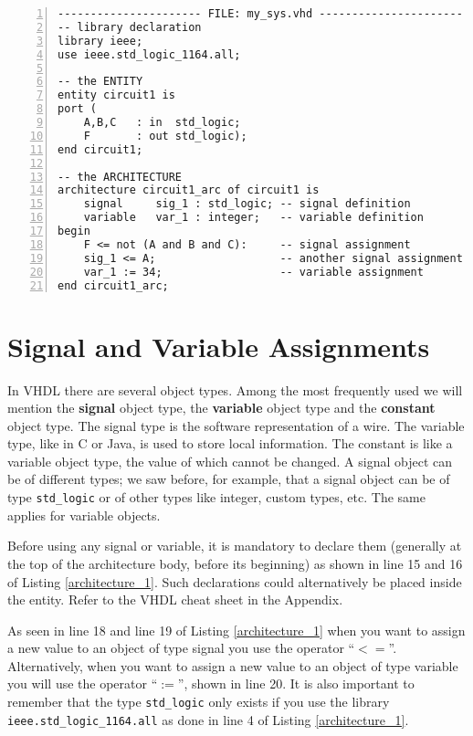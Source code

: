 \begin{lstlisting}[float, numbers=left, label=architecture_1, caption=Example of a simple VHDL block.]
---------------------- FILE: my_sys.vhd ----------------------
-- library declaration
library ieee;
use ieee.std_logic_1164.all;

-- the ENTITY
entity circuit1 is
port (
    A,B,C   : in  std_logic;
    F       : out std_logic);
end circuit1;

-- the ARCHITECTURE
architecture circuit1_arc of circuit1 is
	signal     sig_1 : std_logic; -- signal definition
	variable   var_1 : integer;   -- variable definition
begin
	F <= not (A and B and C):     -- signal assignment
	sig_1 <= A;                   -- another signal assignment
	var_1 := 34;                  -- variable assignment
end circuit1_arc;
\end{lstlisting}

\section{Signal and Variable Assignments}
In VHDL there are several object types. Among the most frequently used we will mention the \textbf{signal} object type, the \textbf{variable} object type and the \textbf{constant} object type. The signal type is the software representation of a wire. The variable type, like in C or Java, is used to store local information. The constant is like a variable object type, the value of which cannot be changed. A signal object can be of different types; we saw before, for example, that a signal object can be of type \texttt{std\_logic} or of other types like integer, custom types, etc. The same applies for variable objects.

Before using any signal or variable, it is mandatory to declare them (generally at the top of the architecture body, before its beginning) as shown in line 15 and 16 of Listing \ref{architecture_1}. Such declarations could alternatively be placed inside the entity. Refer to the VHDL cheat sheet in the Appendix.

As seen in line 18 and line 19 of Listing \ref{architecture_1} when you want to assign a new value to an object of type signal you use the operator ``$<=$''. Alternatively, when you want to assign a new value to an object of type variable you will use the operator ``$:=$'', shown in line 20. It is also important to remember that the type \texttt{std\_logic} only exists if you use the library \texttt{ieee.std\_logic\_1164.all} as done in line 4 of Listing \ref{architecture_1}.

